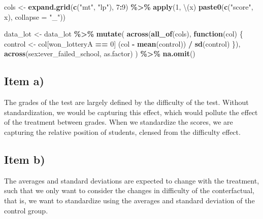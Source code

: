 \documentclass[
]{article}
\newenvironment{Shaded}{\begin{snugshade}}{\end{snugshade}}
\newcommand{\AttributeTok}[1]{\textcolor[rgb]{0.13,0.29,0.53}{#1}}
\newcommand{\ControlFlowTok}[1]{\textcolor[rgb]{0.13,0.29,0.53}{\textbf{#1}}}
\newcommand{\DecValTok}[1]{\textcolor[rgb]{0.00,0.00,0.81}{#1}}
\newcommand{\FunctionTok}[1]{\textcolor[rgb]{0.13,0.29,0.53}{\textbf{#1}}}
\newcommand{\NormalTok}[1]{#1}
\newcommand{\OtherTok}[1]{\textcolor[rgb]{0.56,0.35,0.01}{#1}}
\newcommand{\SpecialCharTok}[1]{\textcolor[rgb]{0.81,0.36,0.00}{\textbf{#1}}}
\newcommand{\StringTok}[1]{\textcolor[rgb]{0.31,0.60,0.02}{#1}}
\begin{document}
\begin{Shaded}
\begin{Highlighting}[]
\NormalTok{cols }\OtherTok{\textless{}{-}} \FunctionTok{expand.grid}\NormalTok{(}\FunctionTok{c}\NormalTok{(}\StringTok{"mt"}\NormalTok{, }\StringTok{"lp"}\NormalTok{), }\DecValTok{7}\SpecialCharTok{:}\DecValTok{9}\NormalTok{) }\SpecialCharTok{\%\textgreater{}\%}
  \FunctionTok{apply}\NormalTok{(}\DecValTok{1}\NormalTok{, \textbackslash{}(x) }\FunctionTok{paste0}\NormalTok{(}\FunctionTok{c}\NormalTok{(}\StringTok{"score"}\NormalTok{, x), }\AttributeTok{collapse =} \StringTok{"\_"}\NormalTok{))}

\NormalTok{data\_lot }\OtherTok{\textless{}{-}}\NormalTok{ data\_lot }\SpecialCharTok{\%\textgreater{}\%}
  \FunctionTok{mutate}\NormalTok{(}
    \FunctionTok{across}\NormalTok{(}\FunctionTok{all\_of}\NormalTok{(cols), }\ControlFlowTok{function}\NormalTok{(col) \{}
\NormalTok{      control }\OtherTok{\textless{}{-}}\NormalTok{ col[won\_lotteryA }\SpecialCharTok{==} \DecValTok{0}\NormalTok{]}
\NormalTok{      (col }\SpecialCharTok{{-}} \FunctionTok{mean}\NormalTok{(control)) }\SpecialCharTok{/} \FunctionTok{sd}\NormalTok{(control)}
\NormalTok{    \}),}
    \FunctionTok{across}\NormalTok{(sex}\SpecialCharTok{:}\NormalTok{ever\_failed\_school, as.factor)}
\NormalTok{  ) }\SpecialCharTok{\%\textgreater{}\%}
  \FunctionTok{na.omit}\NormalTok{()}
\end{Highlighting}
\end{Shaded}

\subsection{Item a)}\label{item-a}

The grades of the test are largely defined by the difficulty of the
test. Without standardization, we would be capturing this effect, which
would pollute the effect of the treatment between grades. When we
standardize the scores, we are capturing the relative position of
students, clensed from the difficulty effect.

\subsection{Item b)}\label{item-b}

The averages and standard deviations are expected to change with the
treatment, such that we only want to consider the changes in difficulty
of the conterfactual, that is, we want to standardize using the averages
and standard deviation of the control group.
\end{document}
